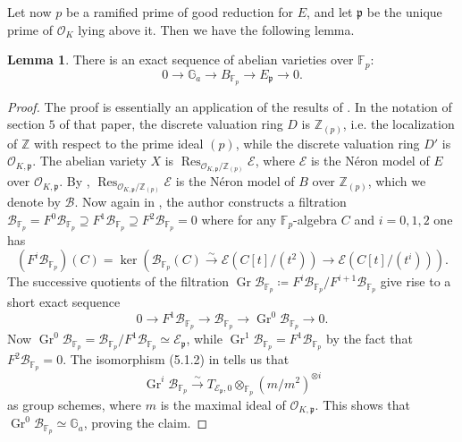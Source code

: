 \documentclass[11pt]{amsart}
\theoremstyle{definition}
\newtheorem{lem}[definizione]{Lemma}
\begin{document}
		Let now $p$ be a ramified prime of good reduction for $E$, and let ${\mathfrak{p}}$ be the unique prime of ${\mathcal{O}}_K$ lying above it. Then we have the following lemma.
			\begin{lem}
				There is an exact sequence of abelian varieties over ${\mathbb{F}}_p$:
				$$0\to \mathbb G_{a}\to B_{{\mathbb{F}}_p}\to E_{\mathfrak{p}}\to 0.$$
		\end{lem}
			\begin{proof}
				The proof is essentially an application of the results of \cite{edi2}. In the notation of section $5$ of that paper, the discrete valuation ring $D$ is ${\mathbb{Z}}_{(p)}$, i.e. the localization of ${\mathbb{Z}}$ with respect to the prime ideal $(p)$, while the discrete valuation ring $D'$ is ${\mathcal{O}}_{K,{\mathfrak{p}}}$. The abelian variety $X$ is $\operatorname{Res}_{{\mathcal{O}}_{K,{\mathfrak{p}}}/{\mathbb{Z}}_{(p)}}\mathcal E$, where $\mathcal E$ is the N\'{e}ron model of $E$ over ${\mathcal{O}}_{K,{\mathfrak{p}}}$. By \cite[Proposition 6, Section 7.6]{bos}, $\operatorname{Res}_{{\mathcal{O}}_{K,{\mathfrak{p}}}/{\mathbb{Z}}_{(p)}}\mathcal E$ is the N\'{e}ron model of $B$ over ${\mathbb{Z}}_{(p)}$, which we denote by $\mathcal B$. Now again in \cite[Section 5.2]{edi2}, the author constructs a filtration $\mathcal B_{{\mathbb{F}}_p}= F^0\mathcal B_{{\mathbb{F}}_p}\supseteq F^1\mathcal B_{{\mathbb{F}}_p}\supseteq F^2\mathcal B_{{\mathbb{F}}_p}=0$ where for any ${\mathbb{F}}_p$-algebra $C$ and $i=0,1,2$ one has
				$$(F^i\mathcal B_{{\mathbb{F}}_p})(C)=\ker (\mathcal B_{{\mathbb{F}}_p}(C)\stackrel{\sim}{\to} \mathcal E(C[t]/(t^2))\to \mathcal E(C[t]/(t^i))).$$
				The successive quotients of the filtration $\operatorname{Gr} \mathcal B_{{\mathbb{F}}_p}\coloneqq F^i\mathcal B_{{\mathbb{F}}_p}/F^{i+1}\mathcal B_{{\mathbb{F}}_p}$ give rise to a short exact sequence
				$$0\to F^1\mathcal B_{{\mathbb{F}}_p}\to \mathcal B_{{\mathbb{F}}_p}\to \operatorname{Gr}^0\mathcal B_{{\mathbb{F}}_p}\to 0.$$
				Now $\operatorname{Gr}^0\mathcal B_{{\mathbb{F}}_p}=\mathcal B_{{\mathbb{F}}_p}/F^1\mathcal B_{{\mathbb{F}}_p}\simeq \mathcal E_{\mathfrak{p}}$, while $\operatorname{Gr}^1\mathcal B_{{\mathbb{F}}_p}=F^1\mathcal B_{{\mathbb{F}}_p}$ by the fact that $F^2\mathcal B_{{\mathbb{F}}_p}=0$. The isomorphism (5.1.2) in \cite{edi2} tells us that
				$$\operatorname{Gr}^i\mathcal B_{{\mathbb{F}}_p}\stackrel{\sim}{\to}T_{\mathcal E_{\mathfrak{p}},0}\otimes_{{\mathbb{F}}_p}(m/m^2)^{\otimes i}$$
				as group schemes, where $m$ is the maximal ideal of ${\mathcal{O}}_{K,{\mathfrak{p}}}$. This shows that $\operatorname{Gr}^0\mathcal B_{{\mathbb{F}}_p}\simeq \mathbb G_{a}$, proving the claim.
\end{proof}
\end{document}
